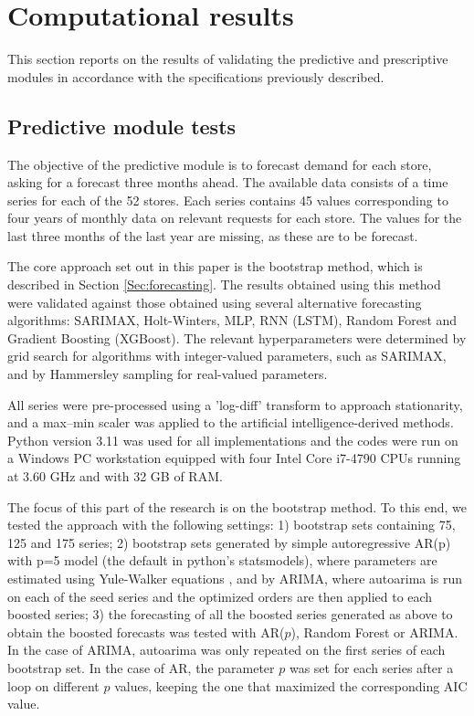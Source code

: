 \documentclass[ijoc,sglanonrev]{informs4}
\begin{document}
\section{Computational results} \label{Sec:results}

This section reports on the results of validating the predictive and prescriptive modules in accordance with the specifications previously described.

\subsection{Predictive module tests}    \label{Subsec:predictive}

The objective of the predictive module is to forecast demand for each store, asking for a forecast three months ahead.
The available data consists of a time series for each of the 52 stores. Each series contains 45 values corresponding to four years of monthly data on relevant requests for each store. The values for the last three months of the last year are missing, as these are to be forecast.

The core approach set out in this paper is the bootstrap method, which is described in Section \ref{Sec:forecasting}. The results obtained using this method were validated against those obtained using several alternative forecasting algorithms: SARIMAX, Holt-Winters, MLP, RNN (LSTM), Random Forest and Gradient Boosting (XGBoost). The relevant hyperparameters were determined by grid search for algorithms with integer-valued parameters, such as SARIMAX, and by Hammersley sampling \citep{H60} for real-valued parameters.

All series were pre-processed using a 'log-diff' transform to approach stationarity, and a max–min scaler was applied to the artificial intelligence-derived methods. Python version 3.11 was used for all implementations and the codes were run on a Windows PC workstation equipped with four Intel Core i7-4790 CPUs running at 3.60 GHz and with 32 GB of RAM.

The focus of this part of the research is on the bootstrap method. To this end, we tested the approach with the following settings: 
1) bootstrap sets containing 75, 125 and 175 series; 
2) bootstrap sets generated by simple autoregressive AR(p) with p=5 model (the default in python's statsmodels), where parameters are estimated using Yule-Walker equations \citep{BD91}, and by ARIMA, where autoarima is run on each of the seed series and the optimized orders are then applied to each boosted series; 
3) the forecasting of all the boosted series generated as above to obtain the boosted forecasts was tested with AR($p$), Random Forest or ARIMA. In the case of ARIMA, autoarima was only repeated on the first series of each bootstrap set. In the case of AR, the parameter $p$ was set for each series after a loop on different $p$ values, keeping the one that maximized the corresponding AIC value.
\end{document}
